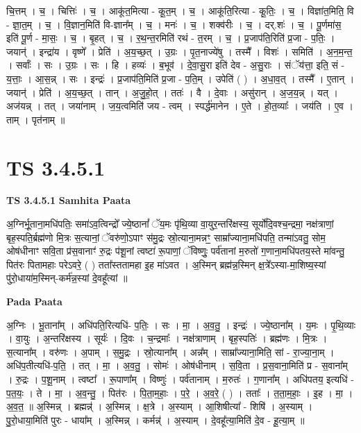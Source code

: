 \documentclass[17pt]{extarticle}
\begin{document}
चि॒त्तम् । च॒ । चित्तिः॑ । च॒ । आकू॑त॒मित्या - कू॒त॒म् । च॒ । आकू॑ति॒रित्या - कू॒तिः॒ । च॒ । विज्ञा॑त॒मिति॒ वि - ज्ञा॒त॒म् । च॒ । वि॒ज्ञान॒मिति॑ वि-ज्ञान᳚म् । च॒ । मनः॑ । च॒ । शक्व॑रीः । च॒ । दर्.शः॑ । च॒ । पू॒र्णमा॑स॒ इति॑ पू॒र्ण - मा॒सः॒ । च॒ । बृ॒हत् । च॒ । र॒थ॒न्त॒रमिति॑ रथं - त॒रम् । च॒ । प्र॒जाप॑ति॒रिति॑ प्र॒जा - प॒तिः॒ । जयान्॑ । इन्द्रा॑य । वृष्णे᳚ । प्रेति॑ । अ॒य॒च्छ॒त् । उ॒ग्रः । पृ॒त॒नाज्ये॑षु । तस्मै᳚ । विशः॑ । समिति॑ । अ॒न॒म॒न्त॒ । सर्वाः᳚ । सः । उ॒ग्रः । सः । हि । हव्यः॑ । ब॒भूव॑ । दे॒वा॒सु॒रा इति॑ देव - अ॒सु॒राः । संॅय॑त्ता॒ इति॒ सं - य॒त्ताः॒ । आ॒स॒न्न् । सः । इन्द्रः॑ । प्र॒जाप॑ति॒मिति॑ प्र॒जा - प॒ति॒म् । उपेति॑ ( ) । अ॒धा॒व॒त् । तस्मै᳚ । ए॒तान् । जयान्॑ । प्रेति॑ । अ॒य॒च्छ॒त् । तान् । अ॒जु॒हो॒त् । ततः॑ । वै । दे॒वाः । असु॑रान् । अ॒ज॒य॒न्न् । यत् । अज॑यन्न् । तत् । जया॑नाम् । ज॒य॒त्वमिति॑ जय - त्वम् । स्पर्द्ध॑मानेन । ए॒ते । हो॒त॒व्याः᳚ । जय॑ति । ए॒व । ताम् । पृत॑नाम् ॥  \newline




\section*{ TS 3.4.5.1 }

\textbf{TS 3.4.5.1 } \newline
\textbf{Samhita Paata} \newline

अ॒ग्निर्भू॒ताना॒मधि॑पतिः॒ समा॑ऽव॒त्विन्द्रो᳚ ज्ये॒ष्ठानां᳚ ॅय॒मः पृ॑थि॒व्या वा॒युर॒न्तरि॑क्षस्य॒ सूर्यो॑दि॒वश्च॒न्द्रमा॒ नक्ष॑त्राणां॒ बृह॒स्पति॒र्ब्रह्म॑णो मि॒त्रः स॒त्यानां॒ ॅवरु॑णो॒ऽपाꣳ स॑मु॒द्रः स्रो॒त्याना॒मन्नꣳ॒॒ साम्रा᳚ज्याना॒मधि॑पति॒ तन्मा॑ऽवतु॒ सोम॒ ओष॑धीनाꣳ सवि॒ता प्र॑स॒वानाꣳ॑ रु॒द्रः प॑शू॒नां त्वष्टा॑ रू॒पाणां॒ ॅविष्णुः॒ पर्व॑तानां म॒रुतो॑ ग॒णाना॒मधि॑पतय॒स्ते मा॑वन्तु॒ पित॑रः पितामहाः परेऽवरे॒ ( ) तता᳚स्ततामहा इ॒ह मा॑ऽवत । अ॒स्मिन् ब्रह्म॑न्न॒स्मिन् क्ष॒त्रे᳚ऽस्या-मा॒शिष्य॒स्यां पु॑रो॒धाया॑म॒स्मिन्-कर्म॑न्न॒स्यां दे॒वहू᳚त्यां ॥ \newline

\textbf{Pada Paata} \newline

अ॒ग्निः । भू॒ताना᳚म् । अधि॑पति॒रित्यधि॑- प॒तिः॒ । सः । मा॒ । अ॒व॒तु॒ । इन्द्रः॑ । ज्ये॒ष्ठाना᳚म् । य॒मः । पृ॒थि॒व्याः । वा॒युः । अ॒न्तरि॑क्षस्य । सूर्यः॑ । दि॒वः । च॒न्द्रमाः᳚ । नक्ष॑त्राणाम् । बृह॒स्पतिः॑ । ब्रह्म॑णः । मि॒त्रः । स॒त्याना᳚म् । वरु॑णः । अ॒पाम् । स॒मु॒द्रः । स्रो॒त्याना᳚म् । अन्न᳚म् । साम्रा᳚ज्याना॒मिति॒ सां - रा॒ज्या॒ना॒म् । अधि॑प॒तीत्यधि॑-प॒ति॒ । तत् । मा॒ । अ॒व॒तु॒ । सोमः॑ । ओष॑धीनाम् । स॒वि॒ता । प्र॒स॒वाना॒मिति॑ प्र - स॒वाना᳚म् । रु॒द्रः । प॒शू॒नाम् । त्वष्टा᳚ । रू॒पाणा᳚म् । विष्णुः॑ । पर्व॑तानाम् । म॒रुतः॑ । ग॒णाना᳚म् । अधि॑पतय॒ इत्यधि॑ - प॒त॒यः॒ । ते । मा॒ । अ॒व॒न्तु॒ । पित॑रः । पि॒ता॒म॒हाः॒ । प॒रे॒ । अ॒व॒रे॒ ( ) । तताः᳚ । त॒ता॒म॒हाः॒ । इ॒ह । मा॒ । अ॒व॒त॒ ॥ अ॒स्मिन्न् । ब्रह्मन्न्॑ । अ॒स्मिन्न् । क्ष॒त्रे । अ॒स्याम् । आ॒शिषीत्या᳚ - शिषि॑ । अ॒स्याम् । पु॒रो॒धाया॒मिति॑ पुरः - धाया᳚म् । अ॒स्मिन्न् । कर्मन्न्॑ । अ॒स्याम् । दे॒वहू᳚त्या॒मिति॑ दे॒व - हू॒त्या॒म् ॥  \newline
\end{document}
